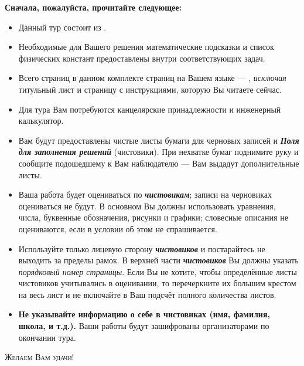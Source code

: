 \thispagestyle{empty}
\begin{center}
    \LARGE\textbf{\scshape{}}%
\end{center}
%
\vspace{2pt}%
%
\begin{center}
    \large{}
\end{center}
\vspace{2pt}
\begin{center}
    \large\textbf{Сначала, пожалуйста, прочитайте следующее:}
\end{center}
\vspace{4pt}

\begin{itemize}[leftmargin=*]
\item Данный тур состоит из .
\item Необходимые для Вашего решения математические подсказки и список физических констант предоставлены внутри соответствующих задач.
\item Всего страниц в данном комплекте страниц на Вашем языке ---  \pageref{LastPage}, \textit{исключая} титульный лист и страницу с инструкциями, которую Вы читаете сейчас.
\item Для тура Вам потребуются канцелярские принадлежности и инженерный калькулятор.
\item Вам будут предоставлены чистые листы бумаги для черновых записей и \textbf{\textit{Поля для заполнения решений}} (чистовики). При нехватке бумаг поднимите руку и сообщите подошедшему к Вам наблюдателю --- Вам выдадут дополнительные листы.
\item Ваша работа будет оцениваться по \textbf{\textit{чистовикам}}; записи на черновиках оцениваться не будут. В основном Вы должны использовать уравнения, числа, буквенные обозначения, рисунки и графики; словесные описания не оцениваются, если в условии об этом не спрашивается.
\item Используйте только лицевую сторону \textbf{\textit{чистовиков}} и постарайтесь не выходить за пределы рамок. В верхней части \textbf{\textit{чистовиков}} Вы должны указать \textit{порядковый номер страницы}. Если Вы не хотите, чтобы определённые листы чистовиков учитывались в оценивании, то перечеркните их большим крестом на весь лист и не включайте в Ваш подсчёт полного количества листов.
\item \textbf{Не указывайте информацию о себе в чистовиках (имя, фамилия, школа, и т.д.).} Ваши работы будут зашифрованы организаторами по окончании тура.
\end{itemize}
%
\vspace{4pt}
\begin{center}
    \textsc{Желаем Вам удачи!}
\end{center}%
%
\begin{center}
    \textit{}
\end{center}

\newpage